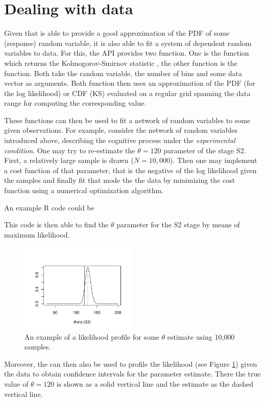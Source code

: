 \section{Dealing with data}
Given that  is able to provide a good approximation of the PDF of some (response) random variable, it is also able to fit a system of dependent random variables to data. For this, the  API provides two function. One is the  function which returns the Kolmogorov-Smirnov statistic \cite[e.g.,][]{Marsaglia2003}, the other function is the  function. Both take the random variable, the   number of bins and some data vector as arguments. Both function then uses an approximation of the PDF (for the log likelihood) or CDF (KS) evaluated on a regular grid spanning the data range for computing the corresponding value.

These functions can then be used to fit a network of random variables to some given observations. For example, consider the network of random variables introduced above, describing the cognitive process under the \emph{experimental condition}. One may try to re-estimate the $\theta=120$ parameter of the stage S2. First, a relatively large sample is drawn ($N=10,000$). Then one may implement a cost function of that parameter, that is the negative of the log likelihood given the samples and finally fit that mode the the data by minimizing the cost function using a numerical optimization algorithm.

An example R code could be


This code is then able to find the $\theta$ parameter for the S2 stage by means of maximum likelihood. 

\begin{figure}[!ht]
 \centering
 \includegraphics[width=0.49\textwidth]{fig/pod_likelihoodProf.pdf}
 \caption{An example of a likelihood profile for some $\theta$ estimate using 10,000 samples.} \label{fig:llprof}
\end{figure}

Moreover, the  can then also be used to profile the likelihood (see Figure \ref{fig:llprof}) given the data to obtain confidence intervals for the parameter estimate. There the true value of $\theta=120$ is shown as a solid vertical line and the estimate as the dashed vertical line. 